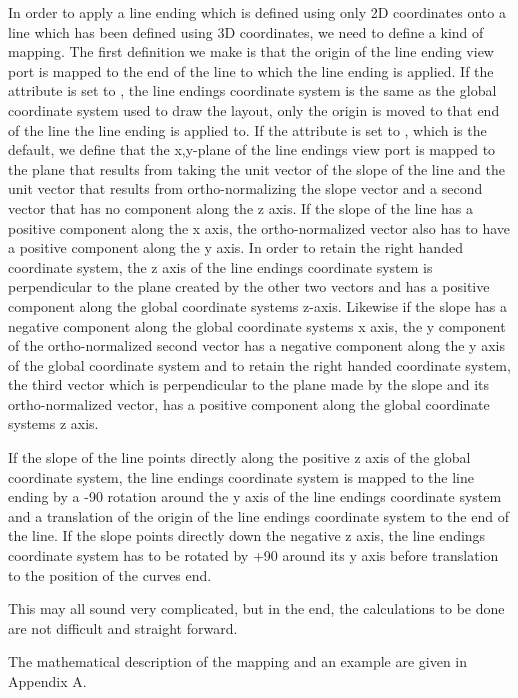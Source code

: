 In order to apply a line ending which is defined using only 2D coordinates onto a line which
has been defined using 3D coordinates, we need to define a kind of mapping.
The first definition we make is that the origin of the line ending view port is
mapped to the end of the line to which the line ending is applied.
If the  attribute is set to , the
line endings coordinate system is the same as the global coordinate system used to draw the layout,
only the origin is moved to that end of the line the line ending is applied to. If
the  attribute is set to , which is
the default, we define that the x,y-plane of the line endings view port is mapped to the
plane that results from taking the unit vector of the slope of the line and the unit
vector that results from ortho-normalizing the slope vector and a second vector
that has no component along the z axis. If the slope of the line has a positive component along the x axis,
the ortho-normalized vector also has to have a positive component along the y axis. In order to retain the
right handed coordinate system, the z axis of the line endings coordinate system is perpendicular to the plane created by the other two vectors and has a positive component along the global coordinate systems z-axis.
Likewise if the slope has a negative component along the global coordinate systems x axis, the y component of the
ortho-normalized second vector has a negative component along the y axis of the global coordinate system and to 
retain the right handed coordinate system, the third vector which is perpendicular to the plane made by the slope
and its ortho-normalized vector, has a positive component along the global coordinate systems z axis. 

If the slope of the line points directly along the positive z axis of the global coordinate system, the 
line endings coordinate system is mapped to the line ending by a -90 rotation around the y axis of the 
line endings coordinate system and a translation of the origin of the line endings coordinate system to 
the end of the line. If the slope points directly down the negative z axis, the line endings coordinate 
system has to be rotated by +90 around its y axis before translation to the position of the curves end.   

This may all sound very complicated, but in the end, the calculations to be done are not difficult and straight forward. 

The mathematical description of the mapping and an example are given in Appendix A.


